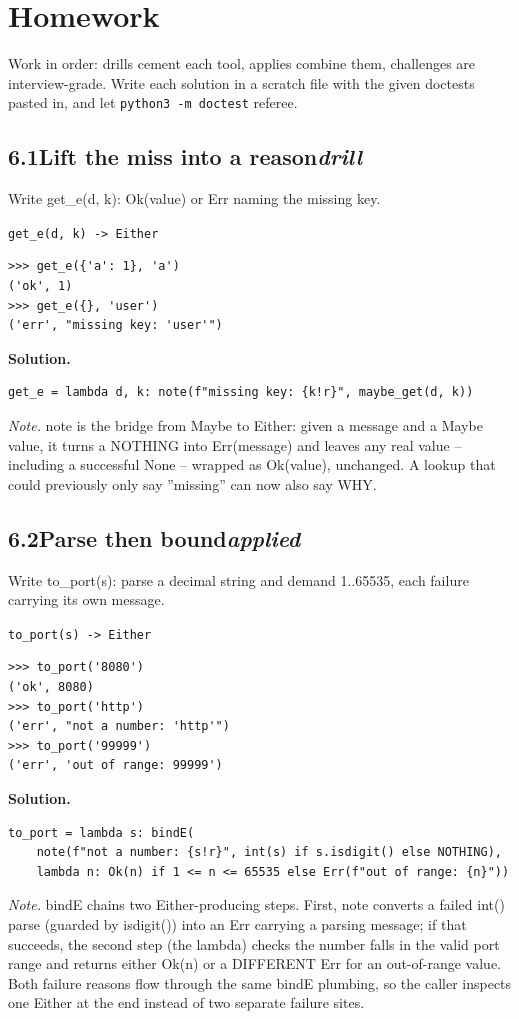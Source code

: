 \documentclass[10pt,letterpaper]{book}
\begin{document}
\section{Homework}
Work in order: drills cement each tool, applies combine them,
challenges are interview-grade. Write each solution in a scratch file with
the given doctests pasted in, and let \texttt{python3 -m doctest} referee.
\subsection*{6.1\quad Lift the miss into a reason\hfill\textnormal{\textit{drill}}}
Write get\_e(d, k): Ok(value) or Err naming the missing key.

\noindent\texttt{get\_e(d, k) -> Either}
\begin{lstlisting}[style=ex]
>>> get_e({'a': 1}, 'a')
('ok', 1)
>>> get_e({}, 'user')
('err', "missing key: 'user'")
\end{lstlisting}
\noindent\textbf{Solution.}
\begin{lstlisting}[style=code]
get_e = lambda d, k: note(f"missing key: {k!r}", maybe_get(d, k))
\end{lstlisting}
\noindent\textit{Note.} note is the bridge from Maybe to Either: given a message and a Maybe value, it turns a NOTHING into Err(message) and leaves any real value -- including a successful None -- wrapped as Ok(value), unchanged. A lookup that could previously only say ''missing'' can now also say WHY.

\subsection*{6.2\quad Parse then bound\hfill\textnormal{\textit{applied}}}
Write to\_port(s): parse a decimal string and demand 1..65535, each failure carrying its own message.

\noindent\texttt{to\_port(s) -> Either}
\begin{lstlisting}[style=ex]
>>> to_port('8080')
('ok', 8080)
>>> to_port('http')
('err', "not a number: 'http'")
>>> to_port('99999')
('err', 'out of range: 99999')
\end{lstlisting}
\noindent\textbf{Solution.}
\begin{lstlisting}[style=code]
to_port = lambda s: bindE(
    note(f"not a number: {s!r}", int(s) if s.isdigit() else NOTHING),
    lambda n: Ok(n) if 1 <= n <= 65535 else Err(f"out of range: {n}"))
\end{lstlisting}
\noindent\textit{Note.} bindE chains two Either-producing steps. First, note converts a failed int() parse (guarded by isdigit()) into an Err carrying a parsing message; if that succeeds, the second step (the lambda) checks the number falls in the valid port range and returns either Ok(n) or a DIFFERENT Err for an out-of-range value. Both failure reasons flow through the same bindE plumbing, so the caller inspects one Either at the end instead of two separate failure sites.
\end{document}
